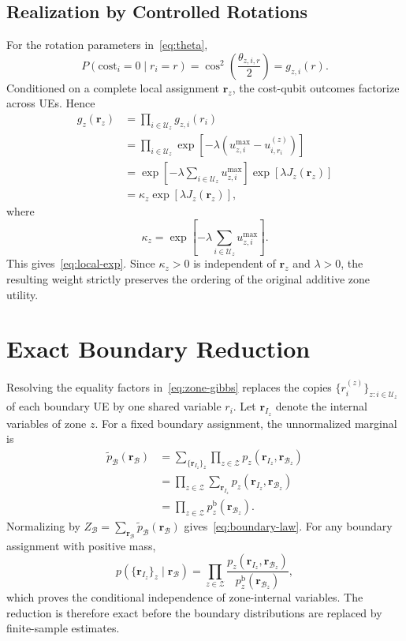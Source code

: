 \documentclass[journal]{IEEEtran}
\newcommand{\calU}{\mathcal{U}}  %
\newcommand{\calZ}{\mathcal{Z}}  %
\newcommand{\calB}{\mathcal{B}}  %
\begin{document}
\subsection{Realization by Controlled Rotations}

For the rotation parameters in~\eqref{eq:theta},
\[
P(\mathrm{cost}_i=0\mid r_i=r)
=
\cos^2\!\left(\frac{\theta_{z,i,r}}{2}\right)
=
g_{z,i}(r).
\]
Conditioned on a complete local assignment $\bm r_z$, the cost-qubit
outcomes factorize across UEs. Hence
\[
\begin{aligned}
g_z(\bm r_z)
&=
\prod_{i\in\calU_z}g_{z,i}(r_i)\\
&=
\prod_{i\in\calU_z}
\exp[-\lambda(u_{z,i}^{\max}-u_{i,r_i}^{(z)})]\\
&=
\exp\!\left[-\lambda
\sum_{i\in\calU_z}u_{z,i}^{\max}\right]
\exp[\lambda J_z(\bm r_z)]\\
&=
\kappa_z\exp[\lambda J_z(\bm r_z)],
\end{aligned}
\]
where
\[
\kappa_z=
\exp\!\left[-\lambda
\sum_{i\in\calU_z}u_{z,i}^{\max}\right].
\]
This gives~\eqref{eq:local-exp}. Since $\kappa_z>0$ is independent of
$\bm r_z$ and $\lambda>0$, the resulting weight strictly preserves the
ordering of the original additive zone utility.

\section{Exact Boundary Reduction}
\label{app:boundary-proof}

Resolving the equality factors in~\eqref{eq:zone-gibbs} replaces the copies $\{r_i^{(z)}\}_{z:i\in\calU_z}$ of each boundary UE by one shared variable $r_i$. Let $\bm r_{I_z}$ denote the internal variables of zone $z$. For a fixed boundary assignment, the unnormalized marginal is
\[
\begin{aligned}
\widetilde p_{\calB}(\bm r_{\calB})
&=
\sum_{\{\bm r_{I_z}\}_z}
\prod_{z\in\calZ}
p_z(\bm r_{I_z},\bm r_{\calB_z})\\
&=
\prod_{z\in\calZ}
\sum_{\bm r_{I_z}}
p_z(\bm r_{I_z},\bm r_{\calB_z})\\
&=
\prod_{z\in\calZ}p_z^{\mathrm{b}}(\bm r_{\calB_z}).
\end{aligned}
\]
Normalizing by $Z_{\calB}=\sum_{\bm r_{\calB}}\widetilde p_{\calB}(\bm r_{\calB})$ gives~\eqref{eq:boundary-law}. For any boundary assignment with positive mass,
\[
p(\{\bm r_{I_z}\}_z\mid\bm r_{\calB})
=
\prod_{z\in\calZ}
\frac{p_z(\bm r_{I_z},\bm r_{\calB_z})}
{p_z^{\mathrm{b}}(\bm r_{\calB_z})},
\]
which proves the conditional independence of zone-internal variables. The reduction is therefore exact before the boundary distributions are replaced by finite-sample estimates.
\end{document}
